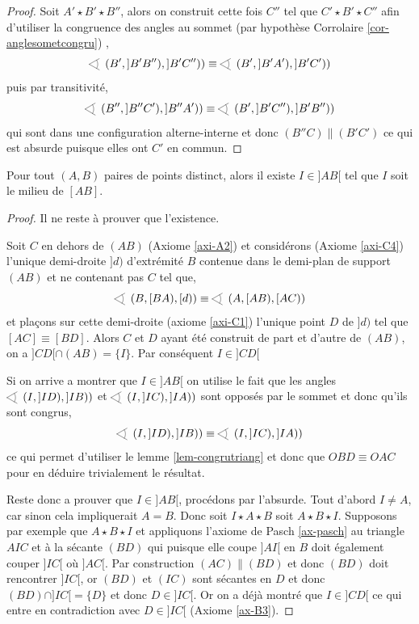 \begin{lem}
\begin{proof}
    Soit $A'\star B'\star B''$, alors on construit cette fois $C''$ tel que $C'\star B'\star C''$ afin d'utiliser la congruence des angles au sommet (par hypothèse Corrolaire \ref{cor-anglesometcongru}) ,
    \begin{equation*}
        \anglesaillant \left(B',]B'B''),]B'C'')\right) \equiv \anglesaillant \left(B',]B'A'),]B'C')\right)
    \end{equation*}
    puis par transitivité,
    \begin{equation*}
        \anglesaillant \left(B'',]B''C'),]B''A')\right) \equiv  \anglesaillant \left(B',]B'C''),]B'B'')\right)
    \end{equation*}   
    qui sont dans une configuration alterne-interne et donc $(B'' C)\| (B'C')$ ce qui est absurde puisque elles ont $C'$ en commun. 
\end{proof}
\end{lem}
\begin{thm}
    Pour tout $(A,B)$ paires de points distinct, alors il existe $I\in ]AB[$ tel que $I$ soit le milieu de $[AB]$.
\begin{proof}
    Il ne reste à prouver que l'existence. 

    Soit $C$ en dehors de $(AB)$ (Axiome \ref{axi-A2}) et considérons (Axiome \ref{axi-C4}) l'unique demi-droite $]d)$  d'extrémité $B$ contenue dans le demi-plan de support $(AB)$ et ne contenant pas $C$ tel que,
    \begin{equation*}
        \anglesaillant \left(B,[BA),[d)\right)\equiv \anglesaillant \left(A,[AB),[AC)\right)
    \end{equation*}
    et plaçons sur cette demi-droite (axiome \ref{axi-C1}) l'unique point $D$ de $]d)$ tel que $[AC]\equiv [BD]$. Alors $C$ et $D$ ayant été construit de part et d'autre de $(AB)$, on a $]CD[\cap (AB) = \{I\}$. Par conséquent $I\in ]CD[$

    Si on arrive a montrer que $I\in ]AB[$ on utilise le fait que les angles $\anglesaillant\left(I, ]ID), ]IB)\right)$ et $\anglesaillant\left(I, ]IC), ]IA)\right)$ sont opposés par le sommet et donc qu'ils sont congrus,
    \begin{equation}
        \anglesaillant\left(I, ]ID), ]IB)\right) \equiv \anglesaillant\left(I, ]IC), ]IA)\right)
    \end{equation}
    ce qui permet d'utiliser le lemme \ref{lem-congrutriang} et donc  que $OBD\equiv OAC$ pour en déduire trivialement le résultat.

    Reste donc a prouver que $I\in ]AB[$, procédons par l'absurde. Tout d'abord $I\neq A$, car sinon cela impliquerait $A=B$. Donc soit $I\star A\star B$ soit $A\star B\star I$. Supposons par exemple que $A\star B\star I$ et appliquons l'axiome de Pasch \ref{ax-pasch} au triangle $AIC$ et à la sécante $(BD)$ qui puisque elle coupe $]AI[$ en $B$ doit également couper $]IC[$ où $]AC[$. Par construction $(AC)\| (BD)$ et donc $(BD)$ doit rencontrer $]IC[$, or $(BD)$ et $(IC)$ sont sécantes en $D$ et donc $(BD)\cap ]IC[ = \{D\}$ et donc $D\in ]IC[$. Or on a déjà montré que $I\in ]CD[$ ce qui entre en contradiction avec $D\in ]IC[$ (Axiome \ref{ax-B3}). 
\end{proof}
\end{thm}
    
